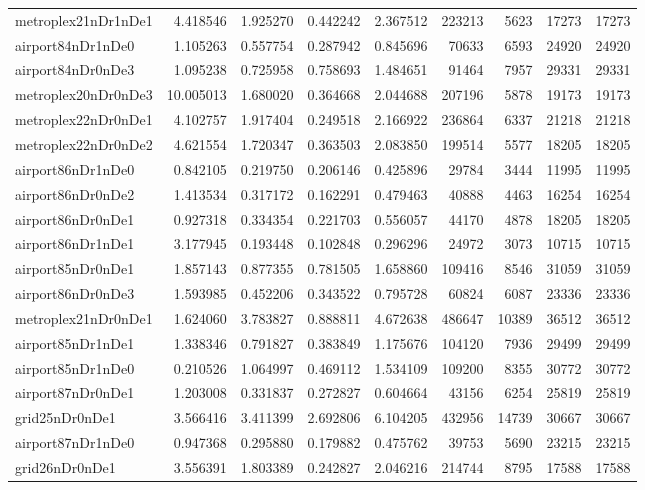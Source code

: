 \begin{longtable}{|l|r|r|r|r|r|r|r|r|}
metroplex21nDr1nDe1 & 4.418546 & 1.925270 & 0.442242 & 2.367512 & 223213 & 5623 & 17273 & 17273 \\
airport84nDr1nDe0 & 1.105263 & 0.557754 & 0.287942 & 0.845696 & 70633 & 6593 & 24920 & 24920 \\
airport84nDr0nDe3 & 1.095238 & 0.725958 & 0.758693 & 1.484651 & 91464 & 7957 & 29331 & 29331 \\
metroplex20nDr0nDe3 & 10.005013 & 1.680020 & 0.364668 & 2.044688 & 207196 & 5878 & 19173 & 19173 \\
metroplex22nDr0nDe1 & 4.102757 & 1.917404 & 0.249518 & 2.166922 & 236864 & 6337 & 21218 & 21218 \\
metroplex22nDr0nDe2 & 4.621554 & 1.720347 & 0.363503 & 2.083850 & 199514 & 5577 & 18205 & 18205 \\
airport86nDr1nDe0 & 0.842105 & 0.219750 & 0.206146 & 0.425896 & 29784 & 3444 & 11995 & 11995 \\
airport86nDr0nDe2 & 1.413534 & 0.317172 & 0.162291 & 0.479463 & 40888 & 4463 & 16254 & 16254 \\
airport86nDr0nDe1 & 0.927318 & 0.334354 & 0.221703 & 0.556057 & 44170 & 4878 & 18205 & 18205 \\
airport86nDr1nDe1 & 3.177945 & 0.193448 & 0.102848 & 0.296296 & 24972 & 3073 & 10715 & 10715 \\
airport85nDr0nDe1 & 1.857143 & 0.877355 & 0.781505 & 1.658860 & 109416 & 8546 & 31059 & 31059 \\
airport86nDr0nDe3 & 1.593985 & 0.452206 & 0.343522 & 0.795728 & 60824 & 6087 & 23336 & 23336 \\
metroplex21nDr0nDe1 & 1.624060 & 3.783827 & 0.888811 & 4.672638 & 486647 & 10389 & 36512 & 36512 \\
airport85nDr1nDe1 & 1.338346 & 0.791827 & 0.383849 & 1.175676 & 104120 & 7936 & 29499 & 29499 \\
airport85nDr1nDe0 & 0.210526 & 1.064997 & 0.469112 & 1.534109 & 109200 & 8355 & 30772 & 30772 \\
airport87nDr0nDe1 & 1.203008 & 0.331837 & 0.272827 & 0.604664 & 43156 & 6254 & 25819 & 25819 \\
grid25nDr0nDe1 & 3.566416 & 3.411399 & 2.692806 & 6.104205 & 432956 & 14739 & 30667 & 30667 \\
airport87nDr1nDe0 & 0.947368 & 0.295880 & 0.179882 & 0.475762 & 39753 & 5690 & 23215 & 23215 \\
grid26nDr0nDe1 & 3.556391 & 1.803389 & 0.242827 & 2.046216 & 214744 & 8795 & 17588 & 17588 \\

\end{longtable}
